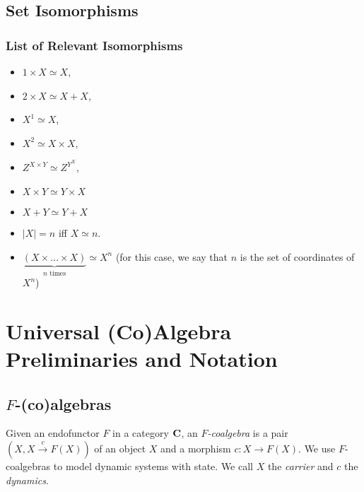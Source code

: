 \subsection{Set Isomorphisms}
\subsubsection{List of Relevant Isomorphisms}
\begin{itemize}
    \item $1\times X \simeq X$,
    \item $2\times X\simeq X+X$,
    \item $X^1\simeq X$,
    \item $X^2\simeq X\times X$,
    \item $Z^{X\times Y}\simeq Z^{Y^X}$,
    \item $X\times Y \simeq Y\times X$
    \item $X + Y \simeq Y+ X$
    \item $|X|=n$ iff $X\simeq n$.
    \item $\underbrace{\left(X\times\ldots\times X\right)}_\text{$n$ times}\simeq X^n$ (for this case, we say that $n$ is the set of coordinates of $X^n$)
\end{itemize}
\section{Universal (Co)Algebra Preliminaries and Notation}
\label{sec:Preliminaries:Coalgebras}
\subsection{$F$-(co)algebras}
Given an endofunctor $F$ in a category $\AsCategory{C}$, an \emph{$F$-coalgebra} is a pair $(X,X\xrightarrow{c}F(X))$ of an object $X$ and a morphism $c\colon X\rightarrow F(X)$. We use $F$-coalgebras to model dynamic systems with state. We call $X$ the \emph{carrier} and $c$ the \emph{dynamics}.

